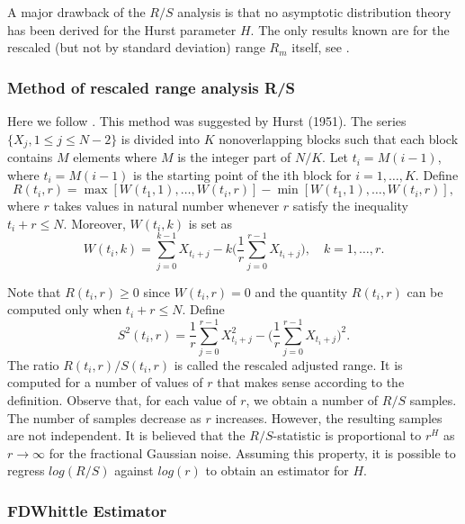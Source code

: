 \documentclass[smallextended]{svjour3}
\begin{document}
        A major drawback of the $R/S$ analysis is  that no asymptotic 
    distribution theory has been derived for the Hurst parameter $H$. 
    The only results known are for  the rescaled (but not by standard 
    deviation) range $R_m$ itself, see \cite{lo}.

    \subsubsection{Method of rescaled range analysis R/S}
        Here we follow  \citet[][Chap. 9]{ra}.
    This method was suggested by Hurst (1951). The series 
    $
        \{X_j , 1 \le j \le N -2\}
    $ is divided into $K$ nonoverlapping blocks such that each block contains 
    $M$ elements where $M$ is the integer part of $N/K$. Let $t_i = M(i - 1)$, 
    where $t_i = M(i- 1)$ is the starting point of the ith block for 
    $i = 1,\ldots, K$. Define
    $$
        R(t_i,r) = 
            \max[W(t_1 , 1), 
                \ldots, W(t_i , r)] - \min[W (t_1 , 1),  \ldots , W
                (t_i , r)],
    $$
    where $r$ takes values in natural number whenever $r$ satisfy the inequality
    $t_i + r \le N$. 
    Moreover, $ W (t_i , k) $ is set as
    \[
        W (t_i , k) = \sum_{j=0}^{k-1} X_{t_i +j}  - k
        \Bigg(\frac{1}{r}\sum_{j=0}^{r-1} X_{t_i +j}  \Bigg),\quad k = 1,\ldots 
        , r.
    \]

        Note that $R(t_i, r) \ge 0$ since $W(t_i , r) = 0$ 
    and the quantity $R(t_i, r)$ can be computed only when $t_i + r \le N$. 
    Define
    \[
        S^2 (t_i , r) = \frac{1}{r} \sum_{j=0}^{r-1} X_{t_i +j}^2  -
        \Bigg(\frac{1}{r}\sum_{j=0}^{r-1} X_{t_i +j}  \Bigg)^2.
    \]
    The ratio $R(t_i , r)/S(t_i , r)$ is called the rescaled adjusted range. It 
    is computed for a number of values of $r$ that makes sense according to the 
    definition.
    Observe that, for each value of $r$, we obtain a number of $R/S$ samples. 
    The number of samples decrease as $r$ increases. However, the resulting 
    samples are not independent. It is believed that the $R/S$-statistic is
    proportional to $r^H$ as $r \to \infty$ for the fractional Gaussian
    noise. Assuming this property, it is possible to regress $log(R/S)$ against 
    $log(r)$ to obtain an estimator for $H$.

    \subsubsection{FDWhittle Estimator}
\end{document}
